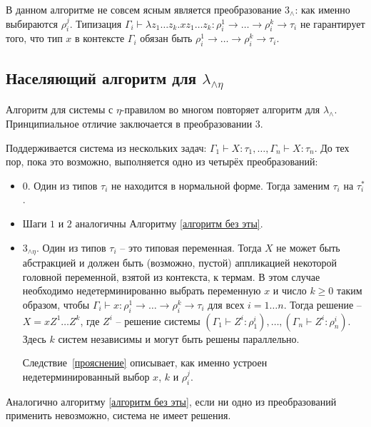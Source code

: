 \documentclass[../main.tex]{subfiles}
\begin{document}
В данном алгоритме не совсем ясным является преобразование $3_{\wedge}$: как именно выбираются $\rho_i^j$. Типизация $\Gamma_i \vdash \lambda z_1 \dots z_k . x z_1 \dots z_k : \rho_i^1 \to \dots \to \rho_i^k \to \tau_i$ не гарантирует того, что тип $x$ в контексте $\Gamma_i$ обязан быть $ \rho_i^1 \to \dots \to \rho_i^k \to \tau_i$. 

\subsection{Населяющий алгоритм для $\lambda_{\wedge \eta}$}

Алгоритм для системы с $\eta$-правилом во многом повторяет алгоритм для $\lambda_\wedge$. Принципиальное отличие заключается в преобразовании $3$.
\begin{algorithm} \label{alg} 
Поддерживается система из нескольких задач: $\Gamma_1 \vdash X : \tau_1 ,\dots, \Gamma_n \vdash X : \tau_n$. До тех пор, пока это возможно, выполняется одно из четырёх преобразований: 

\begin{itemize}

     \item $0$. Один из типов $\tau_i$ не находится в нормальной форме. Тогда заменим $\tau_i$ на $\tau_i^*$.
     \item Шаги $1$ и $2$ аналогичны Алгоритму \ref{алгоритм без эты}.
     
     \item $3_{\wedge \eta}$. Один из типов $\tau_i$ -- это типовая переменная. Тогда $X$ не может быть абстракцией и должен быть (возможно, пустой) аппликацией некоторой головной переменной, взятой из контекста, к термам. В этом случае необходимо недетерминированно выбрать переменную $x$ и число $k \geqslant 0$ таким образом, чтобы  $\Gamma_i \vdash x : \rho_i^1 \to \dots \to \rho_i^k \to \tau_i$ для всех $i = 1 \dots n$. Тогда решение --  $X = x Z^1 \dots Z^k$, где $Z^i$ -- решение системы $(\Gamma_1 \vdash Z^i : \rho_1^i) ,\dots, (\Gamma_n \vdash Z^i : \rho_n^i)$. Здесь $k$ систем независимы и могут быть решены параллельно.
     
     Следствие~\ref{прояснение} описывает, как именно устроен недетерминированный выбор $x$, $k$ и $\rho_i^j$.
     
\end{itemize}

Аналогично алгоритму \ref{алгоритм без эты}, если ни одно из преобразований применить невозможно, система не имеет решения. 

\end{algorithm}
\end{document}
